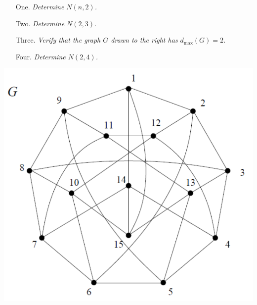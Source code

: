 \documentclass{article}
\begin{document}
\begin{multicols}{2}
\begin{enumerate}
\item[One.] \emph{Determine $N(n,2)$.}
\item[Two.] \emph{Determine $N(2,3)$.}
\item[Three.] \emph{Verify that the graph $G$ drawn to the right has $d_{\mathrm{max}}(G) =2$.}
\item[Four.] \emph{Determine $N(2,4)$.}
\end{enumerate}
\begin{center}
	\includegraphics[scale=0.5]{media/4regdiam2on15}
\end{center}
\end{multicols}
\end{document}
